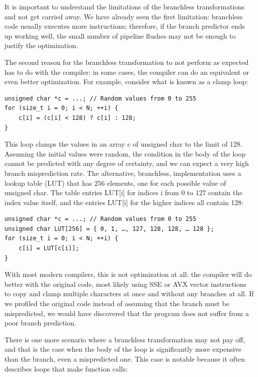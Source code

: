 It is important to understand the limitations of the branchless transformations and not get carried away. We have already seen the first limitation: branchless code usually executes more instructions; therefore, if the branch predictor ends up working well, the small number of pipeline flushes may not be enough to justify the optimization.

The second reason for the branchless transformation to not perform as expected has to do with the compiler: in some cases, the compiler can do an equivalent or even better optimization. For example, consider what is known as a clamp loop:

\begin{lstlisting}[style=styleCXX]
unsigned char *c = ...; // Random values from 0 to 255
for (size_t i = 0; i < N; ++i) {
	c[i] = (c[i] < 128) ? c[i] : 128;
}
\end{lstlisting}

This loop clamps the values in an array c of unsigned char to the limit of 128. Assuming the initial values were random, the condition in the body of the loop cannot be predicted with any degree of certainty, and we can expect a very high branch misprediction rate. The alternative, branchless, implementation uses a lookup table (LUT) that has 256 elements, one for each possible value of unsigned char. The table entries LUT[i] for indices i from 0 to 127 contain the index value itself, and the entries LUT[i] for the higher indices all contain 128:

\begin{lstlisting}[style=styleCXX]
unsigned char *c = ...; // Random values from 0 to 255
unsigned char LUT[256] = { 0, 1, …, 127, 128, 128, … 128 };
for (size_t i = 0; i < N; ++i) {
	c[i] = LUT[c[i]];
}
\end{lstlisting}

With most modern compilers, this is not optimization at all: the compiler will do better with the original code, most likely using SSE or AVX vector instructions to copy and clamp multiple characters at once and without any branches at all. If we profiled the original code instead of assuming that the branch must be mispredicted, we would have discovered that the program does not suffer from a poor branch prediction.

There is one more scenario where a branchless transformation may not pay off, and that is the case when the body of the loop is significantly more expensive than the branch, even a mispredicted one. This case is notable because it often describes loops that make function calls:

